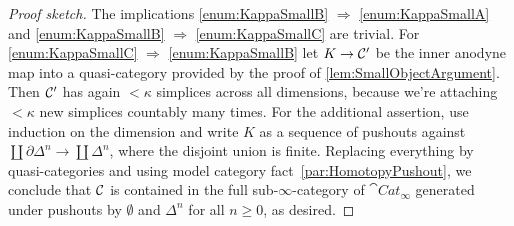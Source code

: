 \begin{proof}[Proof sketch]
	The implications \cref{enum:KappaSmallB} $\Rightarrow$ \cref{enum:KappaSmallA} and \cref{enum:KappaSmallB} $\Rightarrow$ \cref{enum:KappaSmallC} are trivial. For \cref{enum:KappaSmallC} $\Rightarrow$ \cref{enum:KappaSmallB} let $K\rightarrow \mathcal{C}'$ be the inner anodyne map into a quasi-category provided by the proof of \cref{lem:SmallObjectArgument}. Then $\mathcal{C}'$ has again $<\kappa$ simplices across all dimensions, because we're attaching $<\kappa$ new simplices countably many times. For the additional assertion, use induction on the dimension and write $K$ as a sequence of pushouts against $\coprod\partial\Delta^n\rightarrow \coprod\Delta^n$, where the disjoint union is finite. Replacing everything by quasi-categories and using model category fact~\cref{par:HomotopyPushout}, we conclude that $\mathcal{C}$ is contained in the full sub-$\infty$-category of $\cat{Cat}_\infty$ generated under pushouts by $\emptyset$ and $\Delta^n$ for all $n\geqslant 0$, as desired.
	

\end{proof}
